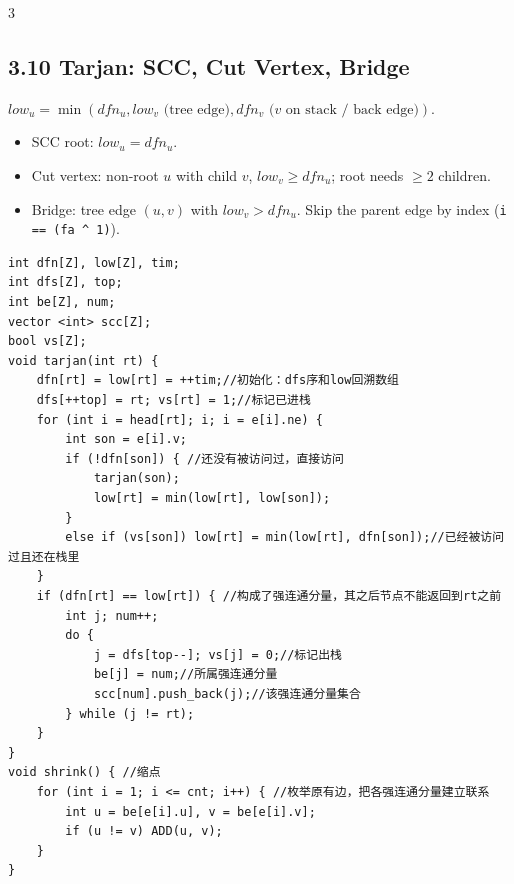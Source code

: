\documentclass[8pt]{extarticle}
\begin{document}
\begin{multicols*}{3}
\subsection*{3.10 Tarjan: SCC, Cut Vertex, Bridge}

$low_u = \min(dfn_u, low_v \text{ (tree edge)}, dfn_v \text{ (}v\text{ on stack / back edge)})$.


\begin{itemize}
\item SCC root: $low_u = dfn_u$.
\item Cut vertex: non-root $u$ with child $v$, $low_v \ge dfn_u$; root needs $\ge 2$ children.
\item Bridge: tree edge $(u, v)$ with $low_v > dfn_u$. Skip the parent edge by index (\texttt{i == (fa \textasciicircum{} 1)}).
\end{itemize}

\begin{lstlisting}
int dfn[Z], low[Z], tim;
int dfs[Z], top;
int be[Z], num;
vector <int> scc[Z];
bool vs[Z];
void tarjan(int rt) {
    dfn[rt] = low[rt] = ++tim;//初始化：dfs序和low回溯数组
    dfs[++top] = rt; vs[rt] = 1;//标记已进栈
    for (int i = head[rt]; i; i = e[i].ne) {
        int son = e[i].v;
        if (!dfn[son]) { //还没有被访问过，直接访问
            tarjan(son);
            low[rt] = min(low[rt], low[son]);
        }
        else if (vs[son]) low[rt] = min(low[rt], dfn[son]);//已经被访问过且还在栈里
    }
    if (dfn[rt] == low[rt]) { //构成了强连通分量，其之后节点不能返回到rt之前
        int j; num++;
        do {
            j = dfs[top--]; vs[j] = 0;//标记出栈
            be[j] = num;//所属强连通分量
            scc[num].push_back(j);//该强连通分量集合
        } while (j != rt);
    }
}
void shrink() { //缩点
    for (int i = 1; i <= cnt; i++) { //枚举原有边，把各强连通分量建立联系
        int u = be[e[i].u], v = be[e[i].v];
        if (u != v) ADD(u, v);
    }
}
\end{lstlisting}


\end{multicols*}
\end{document}
